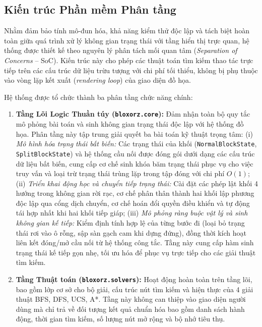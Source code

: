 \subsection{Kiến trúc Phần mềm Phân tầng}
\label{subsec:architecture}
Nhằm đảm bảo tính mô-đun hóa, khả năng kiểm thử độc lập và tách biệt hoàn toàn
giữa quá trình xử lý không gian trạng thái với tầng hiển thị trực quan, hệ thống
được thiết kế theo nguyên lý phân tách mối quan tâm (\textit{Separation of Concerns} -- SoC).
Kiến trúc này cho phép các thuật toán tìm kiếm thao tác trực tiếp trên các cấu trúc
dữ liệu trừu tượng với chi phí tối thiểu, không bị phụ thuộc vào vòng lặp kết xuất
(\textit{rendering loop}) của giao diện đồ họa.

Hệ thống được tổ chức thành ba phân tầng chức năng chính:
\begin{enumerate}[1.]
    \item \textbf{Tầng Lõi Logic Thuần túy (\texttt{bloxorz.core}):}
    Đảm nhận toàn bộ quy tắc mô phỏng bài toán và sinh không gian trạng thái
    độc lập với hệ thống đồ họa. Phân tầng này tập trung giải quyết ba bài toán
    kỹ thuật trọng tâm:
    (i) \textit{Mô hình hóa trạng thái bất biến:} Các trạng thái của khối
    (\texttt{NormalBlockState}, \texttt{SplitBlockState}) và hệ thống cầu nối
    được đóng gói dưới dạng các cấu trúc dữ liệu bất biến,
    cung cấp cơ chế sinh khóa băm trạng thái phục vụ cho việc
    truy vấn và loại trừ trạng thái trùng lặp trong tập đóng với chi phí $O(1)$;
    (ii) \textit{Triển khai động học và chuyển tiếp trạng thái:} Cài đặt các
    phép lật khối 4 hướng trong không gian rời rạc, cơ chế phân thân thành hai khối
    lập phương độc lập qua cổng dịch chuyển, cơ chế hoán đổi quyền điều khiển và tự động
    tái hợp nhất khi hai khối tiếp giáp;
    (iii) \textit{Mô phỏng ràng buộc vật lý và sinh không gian kế tiếp:} Kiểm định tính
    hợp lệ của từng bước đi (loại bỏ trạng thái rơi vào ô rỗng, sập sàn gạch cam khi dựng đứng),
    đồng thời kích hoạt liên kết đóng/mở cầu nối từ hệ thống công tắc. Tầng này cung cấp hàm
    sinh trạng thái kế tiếp gọn nhẹ, tối ưu hóa để phục vụ trực
    tiếp cho các giải thuật tìm kiếm.

    \item \textbf{Tầng Thuật toán (\texttt{bloxorz.solvers}):}
    Hoạt động hoàn toàn trên tầng lõi, bao gồm lớp cơ sở cho bộ giải,
    cấu trúc nút tìm kiếm và hiện thực của 4 giải thuật BFS, DFS, UCS, A*.
    Tầng này không can thiệp vào giao diện người dùng mà chỉ trả về đối
    tượng kết quả chuẩn hóa bao gồm danh sách hành động, thời gian tìm kiếm,
    số lượng nút mở rộng và bộ nhớ tiêu thụ.
\end{enumerate}

